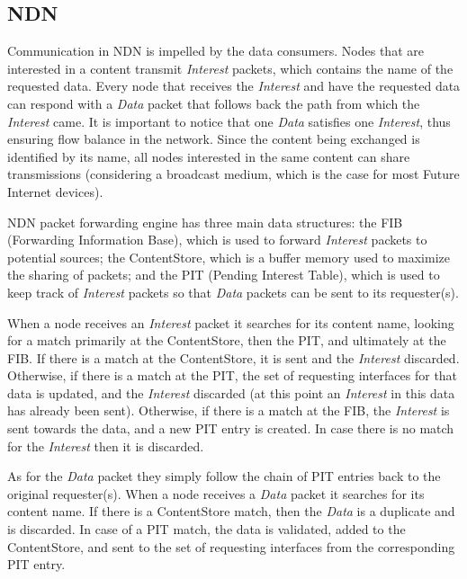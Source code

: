 \subsection{NDN}
Communication in NDN is impelled by the data consumers.
Nodes that are interested in a content transmit \emph{Interest} packets, which contains the name of the requested data. %
Every node that receives the \emph{Interest} and have the requested data can respond with a \emph{Data} packet that follows back the path from which the \emph{Interest} came. %
It is important to notice that one \emph{Data} satisfies one \emph{Interest}, thus ensuring flow balance in the network.
Since the content being exchanged is identified by its name, all nodes interested in the same content can share transmissions (considering a broadcast medium, which is the case for most Future Internet devices).

NDN packet forwarding engine has three main data structures: the FIB (Forwarding Information Base), which is used to forward \emph{Interest} packets to potential sources; 
the ContentStore, which is a buffer memory used to maximize the sharing of packets; 
and the PIT (Pending Interest Table), which is used to keep track of \emph{Interest} packets so that \emph{Data} packets can be sent to its requester(s).

When a node receives an \emph{Interest} packet it searches for its content name, looking for a match primarily at the ContentStore, then the PIT, and ultimately at the FIB.
If there is a match at the ContentStore, it is sent and the \emph{Interest} discarded.
Otherwise, if there is a match at the PIT, the set of requesting interfaces for that data is updated, and the \emph{Interest} discarded (at this point an \emph{Interest} in this data has already been sent).
Otherwise, if there is a match at the FIB, the \emph{Interest} is sent towards the data, and a new PIT entry is created. 
In case there is no match for the \emph{Interest} then it is discarded.

As for the \emph{Data} packet they simply follow the chain of PIT entries back to the original requester(s).
When a node receives a \emph{Data} packet it searches for its content name. 
If there is a ContentStore match, then the \emph{Data} is a duplicate and is discarded.
In case of a PIT match, the data is validated, added to the ContentStore, and sent to the set of requesting interfaces from the corresponding PIT entry.


